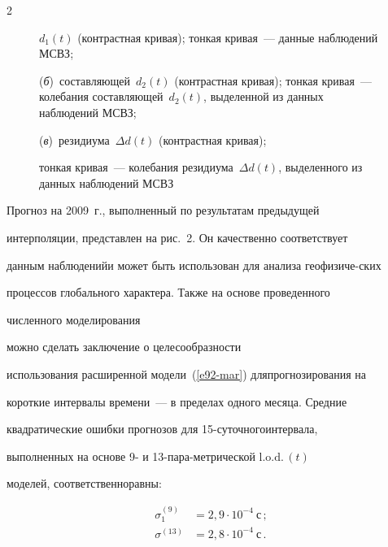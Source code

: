 \begin{multicols}{2}
\begin{figure}
{    $d_1(t)$ (контрастная кривая); тонкая кривая~--- данные наблюдений МСВЗ;


(\textit{б})~составляющей~$d_2(t)$ (контрастная кривая); тонкая кривая~--- колебания составляющей~$d_2(t)$, выделенной из данных наблюдений МСВЗ;


(\textit{в})~резидиума~$\Delta  d(t)$ (контрастная кривая); 


тонкая кривая~--- колебания резидиума~$\Delta d(t)$, выделенного из данных наблюдений МСВЗ


    }


    \end{figure}





Прогноз на 2009~г., выполненный по результатам предыдущей


интерполяции, представлен на рис.~2. Он качественно соответствует


данным наблюдений\linebreak и может быть использован для анализа геофизиче-\linebreak ских


процессов глобального характера. Также на основе проведенного


численного моделирования\linebreak


можно сделать заключение о целесообразности\linebreak


использования расширенной модели~(\ref{e92-mar}) для\linebreak прогнозирования на


короткие интервалы времени~--- в пределах одного месяца. Средние


квад\-ра\-тические ошибки прогнозов для 15-су\-точ\-но\-го\linebreak интервала,


выполненных на основе 9- и 13-па\-ра-\linebreak мет\-ри\-че\-ской $\mathrm{l.o.d.}\,(t)$ 


моделей, соответственно\linebreak равны:


\begin{align*}


\sigma_{1}^{(9)}&=2{,}9\cdot10^{-4}~\mbox{с}\,;\\


\sigma^{(13)}&=2{,}8\cdot10^{-4}~\mbox{с}\,.


\end{align*}






\end{multicols}
